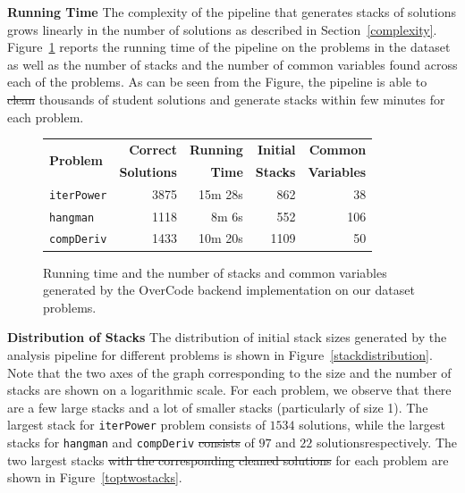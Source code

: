 \documentclass[12pt,twoside]{mitthesis}
\newcommand \codevar[1]{\texttt{#1}}
\providecommand{\DIFaddtex}[1]{{\protect\color{blue}\uwave{#1}}} %
\providecommand{\DIFdeltex}[1]{{\protect\color{red}\sout{#1}}}                      %
\providecommand{\DIFaddbegin}{} %
\providecommand{\DIFaddend}{} %
\providecommand{\DIFdelbegin}{} %
\providecommand{\DIFdelend}{} %
\providecommand{\DIFadd}[1]{\texorpdfstring{\DIFaddtex{#1}}{#1}} %
\providecommand{\DIFdel}[1]{\texorpdfstring{\DIFdeltex{#1}}{}} %
\begin{document}
{{{{{{{{{{{\bf Running Time} The complexity of the pipeline that generates stacks of solutions grows linearly in the number of solutions as described in Section~\ref{complexity}. Figure~\ref{backendevaluation} reports the running time of the pipeline on the problems in the dataset as well as the number of stacks and the number of common variables found across each of the problems. As can be seen from the Figure, the pipeline is able to \DIFdelbegin \DIFdel{clean }\DIFdelend \DIFaddbegin \DIFadd{normalize }\DIFaddend thousands of student solutions and generate stacks within \DIFaddbegin \DIFadd{a }\DIFaddend few minutes for each problem.

\begin{figure}[htpb]
\centering
\begin{tabular}{|l|r|r|r|r|}
\hline
\multirow{2}{*}{\bf Problem} & {\bf Correct} & {\bf Running} & {\bf Initial} & {\bf Common }\\
& {\bf Solutions} & {\bf Time } & {\bf Stacks} & {\bf Variables}\\
\hline\hline
\codevar{iterPower} & 3875 & 15m 28s & 862 & 38\\ \hline
\codevar{hangman} & 1118 & 8m 6s & 552 & 106\\ \hline
\codevar{compDeriv} & 1433 & 10m 20s & 1109 & 50\\ \hline
\end{tabular}
\caption{Running time and the number of stacks and common variables generated by the OverCode backend implementation on our dataset problems.}
\label{backendevaluation}
\end{figure}

{\bf Distribution of Stacks} The distribution of initial stack sizes generated by the analysis pipeline for different problems is shown in Figure~\ref{stackdistribution}. Note that the two axes of the graph corresponding to the size and the number of stacks are shown on a logarithmic scale. For each problem, we observe that there are a few large stacks and a lot of smaller stacks (particularly of size 1). The largest stack for \codevar{iterPower} problem consists of $1534$ solutions, while the largest stacks for \codevar{hangman} and \codevar{compDeriv} \DIFdelbegin \DIFdel{consists }\DIFdelend \DIFaddbegin \DIFadd{consist }\DIFaddend of $97$ and $22$ solutions\DIFaddbegin \DIFadd{, }\DIFaddend respectively. The two largest stacks \DIFdelbegin \DIFdel{with the corresponding cleaned solutions }\DIFdelend for each problem are shown in Figure~\ref{toptwostacks}. 

}}}}}}}}}}
\end{document}
